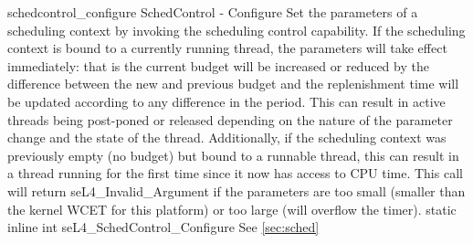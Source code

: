 %
%
%
%

\apidoc
{schedcontrol_configure}
{SchedControl - Configure}
{Set the parameters of a scheduling context by invoking the scheduling control capability.
If the scheduling context is bound to a currently running thread, the parameters will take effect immediately: that is the current budget will be increased or reduced by the difference between the new and previous budget and the replenishment time will be updated according to any difference in the period. 
This can result in active threads being post-poned or released depending on the nature of the parameter change and the state of the thread.
Additionally, if the scheduling context was previously empty (no budget) but bound to a runnable thread, this can result in a thread running for the first time since it now has access to CPU time.
This call will return seL4\_Invalid\_Argument if the parameters are too small (smaller than the kernel WCET for this platform) or too large (will overflow the timer).}
{static inline int seL4\_SchedControl\_Configure }
{
}
{\errorenumdesc}
{See \autoref{sec:sched}}
